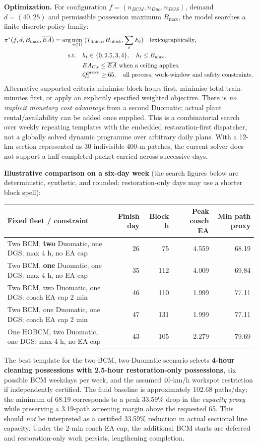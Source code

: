 \documentclass[10pt,a4paper]{article}
\begin{document}
\textbf{Optimization.} For configuration $f=(n_{BCM},n_{Duo},n_{DGS})$, demand $d=(40,25)$ and permissible possession maximum $B_{\max}$, the model searches a finite discrete policy family:
\begin{align}
\pi^*(f,d,B_{\max},\overline{EA})
=\arg\min_{\pi\in\Pi}&\ (T_{\rm finish},H_{\rm block},\sum_t E_t)
\quad\text{lexicographically},\\
\text{s.t.}\quad &h_t\in\{0,2.5,3,4\},\quad h_t\le B_{\max},\\
&EA_{C,t}\le \overline{EA}\text{ when a ceiling applies},\\
&Q_t^{\rm proxy}\ge65,\quad \text{all process, work-window and safety constraints}.
\end{align}
Alternative supported criteria minimise block-hours first, minimise total train-minutes first, or apply an explicitly specified weighted objective. There is \emph{no implicit monetary cost advantage} from a second Duomatic; actual plant rental/availability can be added once supplied. This is a combinatorial search over weekly repeating templates with the embedded restoration-first dispatcher, not a globally solved dynamic programme over arbitrary daily plans. With a 12-km section represented as 30 indivisible 400-m patches, the current solver does not support a half-completed packet carried across successive days.

\textbf{Illustrative comparison on a six-day week} (the search figures below are deterministic, synthetic, and rounded; restoration-only days may use a shorter block spell):
\begin{center}\scriptsize\begin{tabular}{p{.40\linewidth}rrrr}\toprule
Fixed fleet / constraint & Finish day & Block h & Peak coach EA & Min path proxy\\\midrule
Two BCM, \textbf{two} Duomatic, one DGS; max 4 h, no EA cap & 26 & 75 & 4.559 & 68.19\\
Two BCM, \textbf{one} Duomatic, one DGS; max 4 h, no EA cap & 35 & 112 & 4.009 & 69.84\\
Two BCM, two Duomatic, one DGS; coach EA cap 2 min & 46 & 110 & 1.999 & 77.11\\
Two BCM, one Duomatic, one DGS; coach EA cap 2 min & 47 & 131 & 1.999 & 77.11\\
One HOBCM, two Duomatic, one DGS; max 4 h, no EA cap & 43 & 105 & 2.279 & 79.69\\
\bottomrule\end{tabular}\end{center}
The best template for the two-BCM, two-Duomatic scenario selects \textbf{4-hour cleaning possessions with 2.5-hour restoration-only possessions}, six possible BCM weekdays per week, and the assumed 40-km/h workspot restriction if independently certified. The fluid baseline is approximately 102.68 paths/day; the minimum of 68.19 corresponds to a peak 33.59\% drop in the \emph{capacity proxy} while preserving a 3.19-path screening margin above the requested 65. This should \emph{not} be interpreted as a certified 33.59\% reduction in actual sectional line capacity. Under the 2-min coach EA cap, the additional BCM starts are deferred and restoration-only work persists, lengthening completion.
\end{document}

